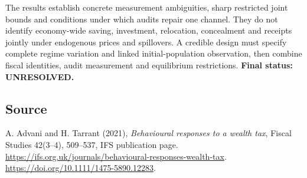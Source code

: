 \documentclass[11pt]{article}
\begin{document}
The results establish concrete measurement ambiguities, sharp restricted
joint bounds and conditions under which audits repair one channel.
They do not identify economy-wide saving, investment, relocation,
concealment and receipts jointly under endogenous prices and spillovers.
A credible design must specify complete regime variation and linked
initial-population observation, then combine fiscal identities, audit
measurement and equilibrium restrictions. \textbf{Final status: UNRESOLVED.}

\subsection*{Source}
A. Advani and H. Tarrant (2021), \emph{Behavioural responses to a wealth
tax}, Fiscal Studies 42(3--4), 509--537, IFS publication page.
\url{https://ifs.org.uk/journals/behavioural-responses-wealth-tax}.
\url{https://doi.org/10.1111/1475-5890.12283}.
\end{document}
